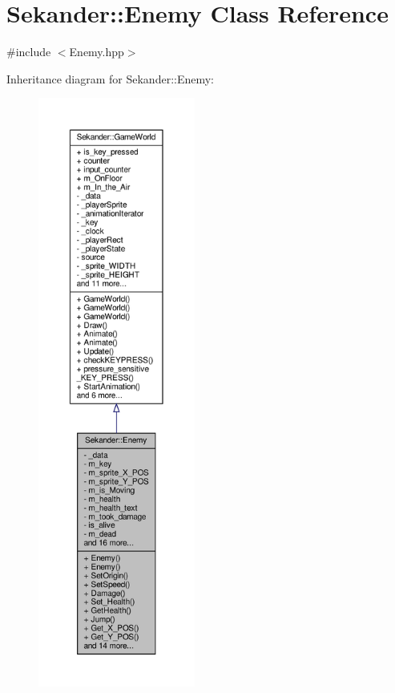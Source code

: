 \hypertarget{classSekander_1_1Enemy}{}\section{Sekander\+:\+:Enemy Class Reference}
\label{classSekander_1_1Enemy}


{\ttfamily \#include $<$Enemy.\+hpp$>$}



Inheritance diagram for Sekander\+:\+:Enemy\+:
\nopagebreak
\begin{figure}[H]
\begin{center}
\leavevmode
\includegraphics[height=550pt]{classSekander_1_1Enemy__inherit__graph}
\end{center}
\end{figure}



